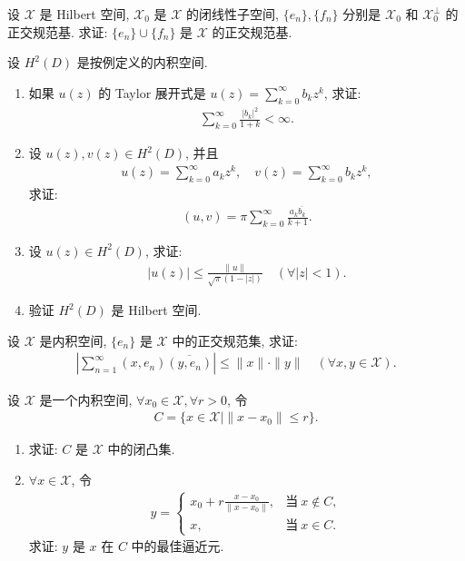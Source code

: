 \documentclass[../../main.tex]{subfiles}%
\begin{document}
\begin{example}
设 $\mathscr{X}$ 是 Hilbert 空间, $\mathscr{X}_0$ 是 $\mathscr{X}$ 的闭线性子空间, $\{e_n\},\{f_n\}$ 分别是 $\mathscr{X}_0$ 和 $\mathscr{X}_0^\perp$ 的正交规范基. 求证: $\{e_n\}\cup\{f_n\}$ 是 $\mathscr{X}$ 的正交规范基.
\end{example}

\begin{example}
设 $H^2(D)$ 是按例定义的内积空间.
\begin{enumerate}[(1)]
\item 如果 $u(z)$ 的 Taylor 展开式是 $u(z)=\sum\limits_{k=0}^\infty b_k z^k$, 求证:
\begin{align*}
\sum\limits_{k=0}^\infty\frac{|b_k|^2}{1+k}<\infty.
\end{align*}
\item 设 $u(z),v(z)\in H^2(D)$, 并且
\begin{align*}
u(z)=\sum\limits_{k=0}^\infty a_k z^k,\quad v(z)=\sum\limits_{k=0}^\infty b_k z^k,
\end{align*}
求证:
\begin{align*}
(u,v)=\pi\sum\limits_{k=0}^\infty\frac{a_k\overline{b_k}}{k+1}.
\end{align*}
\item 设 $u(z)\in H^2(D)$, 求证:
\begin{align*}
|u(z)|\leqslant\frac{\|u\|}{\sqrt{\pi}(1-|z|)}\quad(\forall|z|<1).
\end{align*}
\item 验证 $H^2(D)$ 是 Hilbert 空间.
\end{enumerate}
\end{example}

\begin{example}
设 $\mathscr{X}$ 是内积空间, $\{e_n\}$ 是 $\mathscr{X}$ 中的正交规范集, 求证:
\begin{align*}
\left|\sum\limits_{n=1}^\infty(x,e_n)\overline{(y,e_n)}\right|\leqslant\|x\|\cdot\|y\|\quad(\forall x,y\in\mathscr{X}).
\end{align*}
\end{example}

\begin{example}
设 $\mathscr{X}$ 是一个内积空间, $\forall x_0\in\mathscr{X},\forall r>0$, 令
\begin{align*}
C=\{x\in\mathscr{X}\mid\|x-x_0\|\leqslant r\}.
\end{align*}
\begin{enumerate}[(1)]
\item 求证: $C$ 是 $\mathscr{X}$ 中的闭凸集.
\item $\forall x\in\mathscr{X}$, 令
\begin{align*}
y=
\begin{cases}
x_0+r\frac{x-x_0}{\|x-x_0\|}, & \text{当}\ x\notin C, \\
x, & \text{当}\ x\in C.
\end{cases}
\end{align*}
求证: $y$ 是 $x$ 在 $C$ 中的最佳逼近元.
\end{enumerate}
\end{example}
\end{document}
